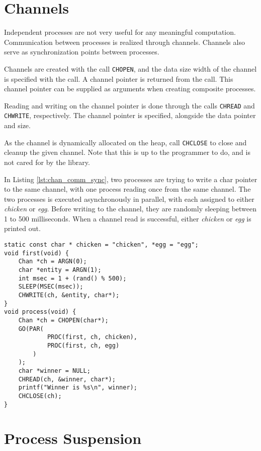 \section*{Channels}

Independent processes are not very useful for any meaningful computation. Communication between processes is realized through channels. Channels also serve as synchronization points between processes. 

Channels are created with the call \texttt{CHOPEN}, and the data size width of the channel is specified with the call. A channel pointer is returned from the call. This channel pointer can be supplied as arguments when creating composite processes. 

Reading and writing on the channel pointer is done through the calls \texttt{CHREAD} and \texttt{CHWRITE}, respectively. The channel pointer is specified, alongside the data pointer and size.

As the channel is dynamically allocated on the heap, call \texttt{CHCLOSE} to close and cleanup the given channel. Note that this is up to the programmer to do, and is not cared for by the library.

In Listing \ref{lst:chan_comm_sync}, two processes are trying to write a char pointer to the same channel, with one process reading once from the same channel. The two processes is executed asynchronously in parallel, with each assigned to either \textit{chicken} or \textit{egg}. Before writing to the channel, they are randomly sleeping between 1 to 500 milliseconds. When a channel read is successful, either \textit{chicken} or \textit{egg} is printed out. 

\begin{lstlisting}[style={CustomC},caption={Channel communication and synchronization},label={lst:chan_comm_sync}]
static const char * chicken = "chicken", *egg = "egg";
void first(void) {
    Chan *ch = ARGN(0);
    char *entity = ARGN(1);
    int msec = 1 + (rand() % 500); 
    SLEEP(MSEC(msec));
    CHWRITE(ch, &entity, char*);
}
void process(void) {
    Chan *ch = CHOPEN(char*);
    GO(PAR(
            PROC(first, ch, chicken),
            PROC(first, ch, egg)
        )
    );
    char *winner = NULL;
    CHREAD(ch, &winner, char*);
    printf("Winner is %s\n", winner);
    CHCLOSE(ch);
}
\end{lstlisting}

\section*{Process Suspension}


